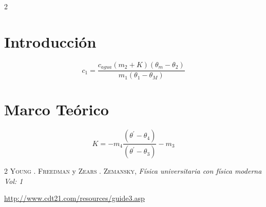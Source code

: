 \documentclass[a4paper,12pt]{article}
\begin{document}
\begin{multicols}{2}
\section{Introducción}
\lipsum
\begin{equation}
c_{1}=\frac{c_{agua}(m_{2}+K)(\theta_{m}-\theta_{2})}{m_{1}(\theta_{1}-\theta_{M})}
\end{equation}
\section{Marco Teórico}
\begin{equation}
K=-m_{4}\frac{(\theta^{'}-\theta_{4})}{(\theta^{'}-\theta_{3})} - m_{3}
\end{equation}
\lipsum
\end{multicols}
\begin{thebibliography}{2}
 \textsc{Young . Freedman} y \textsc{Zears . Zemansky},
\textit{Física universitaria con física moderna Vol: 1}

\url{http://www.cdt21.com/resources/guide3.asp}


\end{thebibliography}
\end{document}
